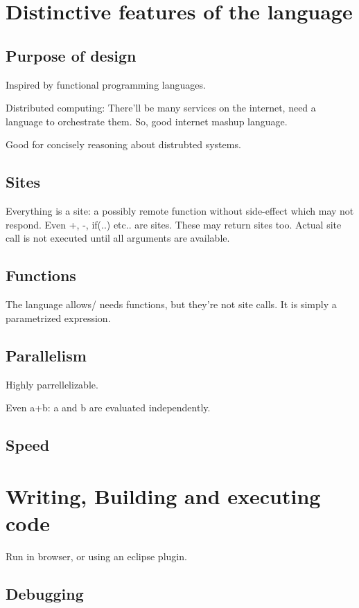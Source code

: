 \documentclass[oneside, article]{memoir}
\begin{document}
\section{Distinctive features of the language}
\subsection{Purpose of design}
Inspired by functional programming languages.

Distributed computing: There'll be many services on the internet, need a language to orchestrate them. So, good internet mashup language.

Good for concisely reasoning about distrubted systems.

\subsection{Sites}
Everything is a site: a possibly remote function without side-effect which may not respond. Even +, -, if(..) etc.. are sites. These may return sites too. Actual site call is not executed until all arguments are available.

\subsection{Functions}
The language allows/ needs functions, but they're not site calls. It is simply a parametrized expression.

\subsection{Parallelism}
Highly parrellelizable.

Even a+b: a and b are evaluated independently.

\subsection{Speed}

\section{Writing, Building and executing code}
Run in browser, or using an eclipse plugin.

\subsection{Debugging}
\end{document}
